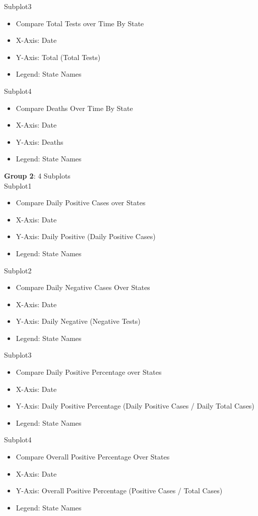 \documentclass[11pt]{article}
\begin{document}
\noindent
Subplot3
\begin{itemize}
    \item Compare Total Tests over Time By State
    \item X-Axis: Date
    \item Y-Axis: Total (Total Tests)
    \item Legend: State Names
\end{itemize}

\noindent
Subplot4
\begin{itemize}
    \item Compare Deaths Over Time By State
    \item X-Axis: Date
    \item Y-Axis: Deaths
    \item Legend: State Names
\end{itemize}

\pagebreak

\noindent
\textbf{Group 2}: 4 Subplots \\

\noindent
Subplot1
\begin{itemize}
    \item Compare Daily Positive Cases over States
    \item X-Axis: Date
    \item Y-Axis: Daily Positive (Daily Positive Cases)
    \item Legend: State Names
\end{itemize}

\noindent
Subplot2
\begin{itemize}
    \item Compare Daily Negative Cases Over States
    \item X-Axis: Date
    \item Y-Axis: Daily Negative (Negative Tests)
    \item Legend: State Names
\end{itemize}

\noindent
Subplot3
\begin{itemize}
    \item Compare Daily Positive Percentage over States
    \item X-Axis: Date
    \item Y-Axis: Daily Positive Percentage (Daily Positive Cases / Daily Total Cases)
    \item Legend: State Names
\end{itemize}

\noindent
Subplot4
\begin{itemize}
    \item Compare Overall Positive Percentage Over States
    \item X-Axis: Date
    \item Y-Axis: Overall Positive Percentage (Positive Cases / Total Cases)
    \item Legend: State Names
\end{itemize}
\end{document}
